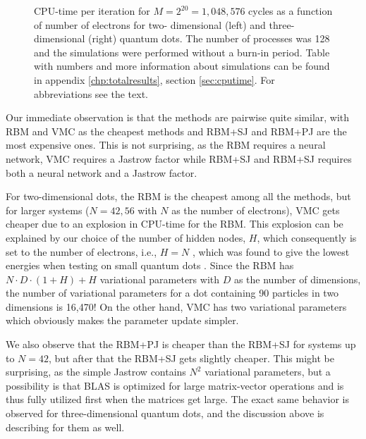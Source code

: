 \begin{figure}[h]
	\centering 
	
	\caption{CPU-time per iteration for $M=2^{20}=1,048,576$ cycles as a function of number of electrons for two- dimensional (left) and three-dimensional (right) quantum dots. The number of processes was 128 and the simulations were performed without a burn-in period. Table with numbers and more information about simulations can be found in appendix \ref{chp:totalresults}, section \ref{sec:cputime}. For abbreviations see the text.}
	\label{fig:cpu_time}
\end{figure} 

Our immediate observation is that the methods are pairwise quite similar, with RBM and VMC as the cheapest methods and RBM+SJ and RBM+PJ are the most expensive ones. This is not surprising, as the RBM requires a neural network, VMC requires a Jastrow factor while RBM+SJ and RBM+SJ requires both a neural network and a Jastrow factor. 

For two-dimensional dots, the RBM is the cheapest among all the methods, but for larger systems ($N=42,56$ with $N$ as the number of electrons), VMC gets cheaper due to an explosion in CPU-time for the RBM. This explosion can be explained by our choice of the number of hidden nodes, $H$, which consequently is set to the number of electrons, i.e., $H=N$ , which was found to give the lowest energies when testing on small quantum dots \cite{nordhagen_computational_2018}. Since the RBM has $N\cdot D\cdot (1+H)+H$ variational parameters with $D$ as the number of dimensions, the number of variational parameters for a dot containing 90 particles in two dimensions is 16,470! On the other hand, VMC has two variational parameters which obviously makes the parameter update simpler. 

We also observe that the RBM+PJ is cheaper than the RBM+SJ for systems up to $N=42$, but after that the RBM+SJ gets slightly cheaper. This might be surprising, as the simple Jastrow contains $N^2$ variational parameters, but a possibility is that BLAS is optimized for large matrix-vector operations and is thus fully utilized first when the matrices get large. The exact same behavior is observed for three-dimensional quantum dots, and the discussion above is describing for them as well.

